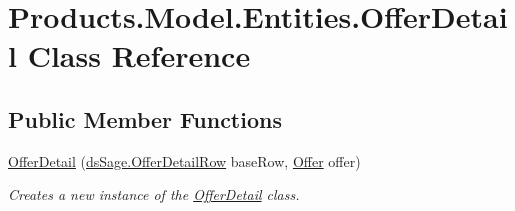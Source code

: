 \hypertarget{class_products_1_1_model_1_1_entities_1_1_offer_detail}{}\section{Products.\+Model.\+Entities.\+Offer\+Detail Class Reference}
\label{class_products_1_1_model_1_1_entities_1_1_offer_detail}
\subsection*{Public Member Functions}
\begin{DoxyCompactItemize}
\item 
\hyperlink{class_products_1_1_model_1_1_entities_1_1_offer_detail_aac68c0aaeeed1a4bd86582d2ce066deb}{Offer\+Detail} (\hyperlink{class_products_1_1_data_1_1ds_sage_1_1_offer_detail_row}{ds\+Sage.\+Offer\+Detail\+Row} base\+Row, \hyperlink{class_products_1_1_model_1_1_entities_1_1_offer}{Offer} offer)
\begin{DoxyCompactList}\small\item\em Creates a new instance of the \hyperlink{class_products_1_1_model_1_1_entities_1_1_offer_detail}{Offer\+Detail} class. \end{DoxyCompactList}\end{DoxyCompactItemize}
